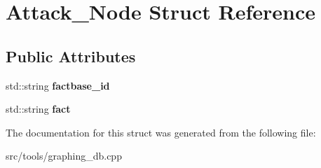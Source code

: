 \hypertarget{struct_attack___node}{}\section{Attack\+\_\+\+Node Struct Reference}
\label{struct_attack___node}
\subsection*{Public Attributes}
\begin{DoxyCompactItemize}
\item 
\mbox{\label{struct_attack___node_ae02f66fca60568ee833aa48412a7dd1c}} 
std\+::string {\bfseries factbase\+\_\+id}
\item 
\mbox{\label{struct_attack___node_a0077c68abdb58675e3eca13d4d5a6b18}} 
std\+::string {\bfseries fact}
\end{DoxyCompactItemize}


The documentation for this struct was generated from the following file\+:\begin{DoxyCompactItemize}
\item 
src/tools/graphing\+\_\+db.\+cpp\end{DoxyCompactItemize}
